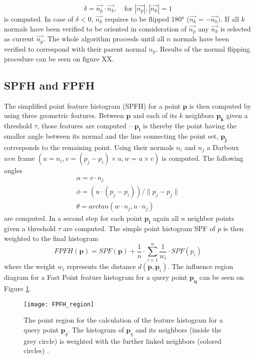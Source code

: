 \begin{equation}
\delta = \vec{n_p} \cdot \vec{n_k}, \quad \text{for $|\vec{n_p}|, |\vec{n_k}| = 1$}
\end{equation}
is computed. In case of $\delta < 0$, $\vec{n_k}$ requires to be flipped 180° ($\vec{n_k} = -\vec{n_k})$. If all $k$ normals have been verified to be oriented in consideration of $\vec{n_p}$ any $\vec{n_k}$ is selected as current $\vec{n_p}$. The whole algorithm proceeds until all $n$ normals have been verified to correspond with their parent normal $n_p$. Results of the normal flipping procedure can be seen on figure XX.


\subsection{SPFH and FPFH}

The simplified point feature histogram (SPFH) for a point $\boldsymbol{p}$ is then computed by using three geometric features. Between $\boldsymbol{p}$ and each of its $k$ neighbors $\boldsymbol{p_k}$ given a threshold $\tau$, those features are computed -- $\boldsymbol{p_i}$ is thereby the point having the smaller angle between its normal and the line connecting the point set, $\boldsymbol{p_j}$ corresponds to the remaining point. Using their normals $n_i$ and $n_j$ a Darboux $uvn$ frame $(u = n_i, v = (p_j - p_i) \times u, w = u \times v)$ is computed. The following angles
\begin{equation}
\begin{split}
\alpha = v \cdot n_j
\\
\phi = (u \cdot (p_j - p_i))/\|p_j - p_j\|
\\
\theta = arctan(w \cdot n_j, u \cdot n_j)
\end{split}
\label{eq:AngularVariations}
\end{equation}
are computed. In a second step for each point $\boldsymbol{p_i}$ again all $n$ neighbor points given a threshold $\tau$ are computed. The simple point histogram SPF of $p$ is then weighted to the final histogram
\begin{equation}
FPFH(\boldsymbol{p}) = SPF(\boldsymbol{p}) + \frac{1}{n} \cdot \displaystyle\sum_{i=1}^{n}\frac{1}{w_i} \cdot SPF(p_i)
\end{equation}
where the weight $w_i$ represents the distance $d(\boldsymbol{p},\boldsymbol{p}_i)$. The influence region diagram for a Fast Point feature histogram for a query point $\boldsymbol{p_q}$ can be seen on Figure \ref{fig:FPFHregion}. 
\begin{figure}[H]
	\centering
	\texttt{[image: FPFH\_region]}
	\caption{The point region for the calculation of the feature histogram for a query point $\boldsymbol{p}_q$. The histogram of $\boldsymbol{p}_q$ and its neighbors (inside the grey circle) is weighted with the further linked neighbors (colored circles) \cite{FPFH}.}
	\label{fig:FPFHregion}
\end{figure}

